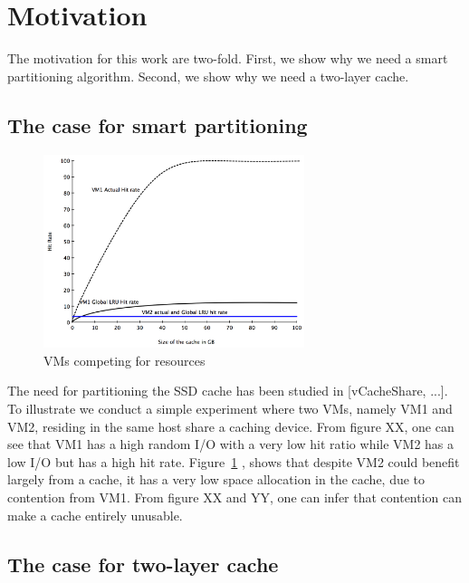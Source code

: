 
\section{Motivation}
The motivation for this work are two-fold. First, we show why we need a smart partitioning algorithm. Second, we show why we need a two-layer cache.

\subsection{The case for smart partitioning}

\begin{figure}[tb]
\setlength{\belowcaptionskip}{-15pt}
\centering
\includegraphics[width=3in]{figures/hitrate_fake}
\caption{VMs competing for resources}
\label{fig:compete}
\end{figure}

The need for partitioning the SSD cache has been studied in [vCacheShare, ...]. To illustrate we conduct a simple experiment where two VMs, namely VM1 and VM2, residing in the same host share a caching device. From figure XX, one can see that VM1 has a high random I/O with a very low hit ratio while VM2 has a low I/O but has a high hit rate. Figure~\ref{fig:compete} , shows that despite VM2 could benefit largely from a cache, it has a very low space allocation in the cache, due to contention from VM1. From figure XX and YY, one can infer that contention can make a cache entirely unusable.

\subsection{The case for two-layer cache}

